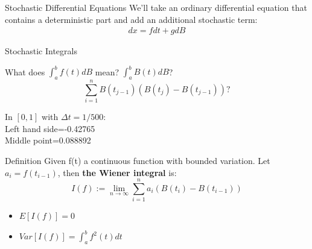 \begin{frame}{Stochastic Differential Equations}
\pause
We'll take an ordinary differential equation that contains a deterministic part and add an additional stochastic term:
\begin{eqnarray*}
dx=fdt+gdB
\end{eqnarray*}
\end{frame}

\begin{frame}{Stochastic Integrals}
\pause
\begin{center}
What does $\int_{a}^{b} f(t)dB$ mean? \bigskip \pause  $\int_{a}^{b} B(t)dB$?\pause \\

\begin{equation*}
\sum_{i=1}^{n}B(t_{j-1})\left( B(t_{j})-B(t_{j-1})\right) ?
\end{equation*}
\pause
\bigskip

In $[0,1]$ with $\Delta t=1/500$:\\ 
Left hand side=-0.42765\\ 
Middle point=0.088892
\end{center}
\end{frame}


\begin{frame}
\begin{block}{Definition}
Given f(t) a continuous function with bounded variation. Let $a_i=f(t_{i-1})$, then \textbf{the Wiener integral} is:
\begin{equation*}
I(f):=\lim_{n \to \infty}\sum_{i=1}^{n}a_i(B(t_i)-B(t_{i-1}))
\end{equation*}
\pause
\begin{itemize}
\item $E[I(f)]=0$
\item $Var[I(f)]=\int_{a}^{b}f^2(t)dt$
\end{itemize}
\end{block}
\end{frame}

